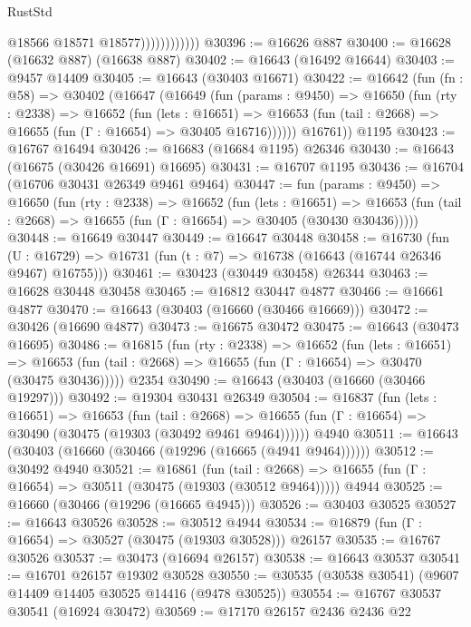 \begin{lexlean}{RustStd}
\begin{coremodule}
                            @18566
                            @18571
                            @18577))))))))))))
@30396 := @16626 @887
@30400 := @16628 (@16632 @887) (@16638 @887)
@30402 := @16643 (@16492 @16644)
@30403 := @9457 @14409
@30405 := @16643 (@30403 @16671)
@30422 := @16642
    (fun (fn : @58) =>
    @30402
      (@16647
        (@16649
          (fun (params : @9450) =>
          @16650
            (fun (rty : @2338) =>
            @16652
              (fun (lets : @16651) =>
              @16653 (fun (tail : @2668) => @16655 (fun (Γ : @16654) => @30405 @16716))))))
        @16761))
    @1195
@30423 := @16767 @16494
@30426 := @16683 (@16684 @1195) @26346
@30430 := @16643 (@16675 (@30426 @16691) @16695)
@30431 := @16707 @1195
@30436 := @16704 (@16706 @30431 @26349 @9461 @9464)
@30447 := fun (params : @9450) =>
  @16650
    (fun (rty : @2338) =>
    @16652
      (fun (lets : @16651) =>
      @16653 (fun (tail : @2668) => @16655 (fun (Γ : @16654) => @30405 (@30430 @30436)))))
@30448 := @16649 @30447
@30449 := @16647 @30448
@30458 := @16730
    (fun (U : @16729) => @16731 (fun (t : @7) => @16738 (@16643 (@16744 @26346 @9467) @16755)))
@30461 := @30423 (@30449 @30458) @26344
@30463 := @16628 @30448 @30458
@30465 := @16812 @30447 @4877
@30466 := @16661 @4877
@30470 := @16643 (@30403 (@16660 (@30466 @16669)))
@30472 := @30426 (@16690 @4877)
@30473 := @16675 @30472
@30475 := @16643 (@30473 @16695)
@30486 := @16815
    (fun (rty : @2338) =>
    @16652
      (fun (lets : @16651) =>
      @16653 (fun (tail : @2668) => @16655 (fun (Γ : @16654) => @30470 (@30475 @30436)))))
    @2354
@30490 := @16643 (@30403 (@16660 (@30466 @19297)))
@30492 := @19304 @30431 @26349
@30504 := @16837
    (fun (lets : @16651) =>
    @16653
      (fun (tail : @2668) =>
      @16655 (fun (Γ : @16654) => @30490 (@30475 (@19303 (@30492 @9461 @9464))))))
    @4940
@30511 := @16643 (@30403 (@16660 (@30466 (@19296 (@16665 (@4941 @9464))))))
@30512 := @30492 @4940
@30521 := @16861
    (fun (tail : @2668) => @16655 (fun (Γ : @16654) => @30511 (@30475 (@19303 (@30512 @9464)))))
    @4944
@30525 := @16660 (@30466 (@19296 (@16665 @4945)))
@30526 := @30403 @30525
@30527 := @16643 @30526
@30528 := @30512 @4944
@30534 := @16879 (fun (Γ : @16654) => @30527 (@30475 (@19303 @30528))) @26157
@30535 := @16767 @30526
@30537 := @30473 (@16694 @26157)
@30538 := @16643 @30537
@30541 := @16701 @26157 @19302 @30528
@30550 := @30535 (@30538 @30541) (@9607 @14409 @14405 @30525 @14416 (@9478 @30525))
@30554 := @16767 @30537 @30541 (@16924 @30472)
@30569 := @17170
    @26157
    @2436
    @2436
    @22

\end{coremodule}
\end{lexlean}
